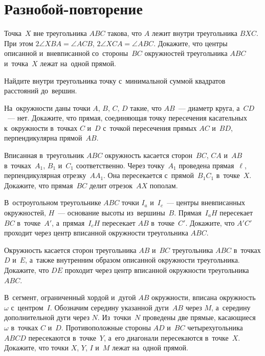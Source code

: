 
\section*{Разнобой-повторение}


\begin{problems}

\item
Точка~$X$ вне треугольника $ABC$ такова, что $A$ лежит внутри
треугольника $BXC$.
При этом $2 \angle XBA = \angle ACB$, $2 \angle XCA = \angle ABC$.
Докажите, что центры описанной и~вневписанной со~стороны~$BC$ окружностей
треугольника $ABC$ и~точка~$X$ лежат на~одной прямой.

\item
Найдите внутри треугольника точку с~минимальной суммой квадратов расстояний
до~вершин.

\item
На~окружности даны точки $A$, $B$, $C$, $D$ такие, что $AB$~--- диаметр круга,
а~$CD$~--- нет.
Докажите, что прямая, соединяющая точку пересечения касательных к~окружности
в~точках $C$ и~$D$ с~точкой пересечения прямых $AC$ и~$BD$, перпендикулярна
прямой~$AB$.

\item
Вписанная в~треугольник $ABC$ окружность касается сторон~$BC$, $CA$ и~$AB$
в~точках~$A_1$, $B_1$ и~$C_1$ соответственно.
Через точку~$A_1$ проведена прямая~$\ell$, перпендикулярная отрезку~$A A_1$.
Она пересекается с~прямой~$B_1 C_1$ в~точке~$X$.
Докажите, что прямая~$BC$ делит отрезок~$AX$ пополам.

\item
В~остроугольном треугольнике $ABC$ точки $I_{a}$ и~$I_{c}$~--- центры
вневписанных окружностей, $H$~--- основание высоты из~вершины~$B$.
Прямая~$I_{a} H$ пересекает $BC$ в~точке~$A'$, а~прямая~$I_{c} H$ пересекает
$AB$ в~точке~$C'$.
Докажите, что $A'C'$ проходит через центр вписанной окружности
треугольника $ABC$.

\item
Окружность касается сторон треугольника $AB$ и~$BC$ треугольника $ABC$
в~точках $D$ и~$E$, а~также внутренним образом описанной окружности
треугольника.
Докажите, что $DE$ проходит через центр вписанной окружности
треугольника $ABC$.

\item
В~сегмент, ограниченный хордой и~дугой $AB$ окружности, вписана окружность
$\omega$ с~центром~$I$.
Обозначим середину указанной дуги~$AB$ через $M$, а~середину дополнительной
дуги через $N$.
Из~точки~$N$ проведены две прямые, касающиеся $\omega$ в~точках $C$ и~$D$.
Противоположные стороны $AD$ и~$BC$ четырехугольника $ABCD$ пересекаются
в~точке~$Y$, а~его диагонали пересекаются в~точке~$X$.
Докажите, что точки $X$, $Y$, $I$ и~$M$ лежат на~одной прямой.


\end{problems}
